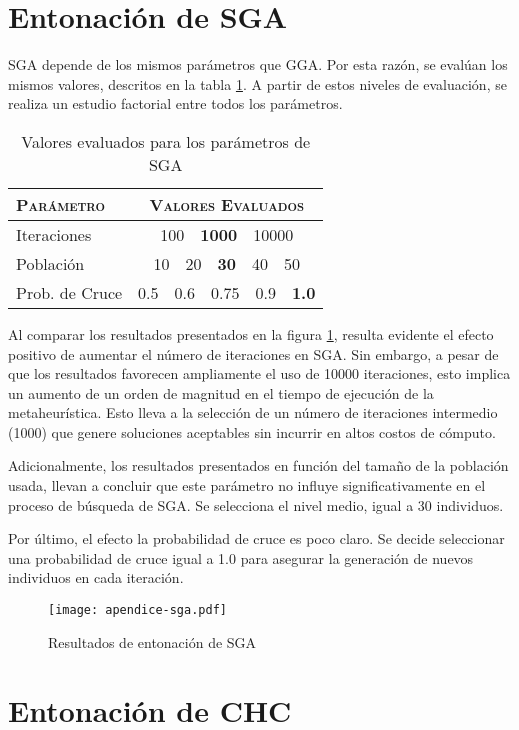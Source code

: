 \section{Entonación de SGA}

SGA depende de los mismos parámetros que GGA. Por esta razón, se evalúan los mismos valores, descritos en la tabla \ref{table-ap-sga}. A partir de estos niveles de evaluación, se realiza un estudio factorial entre todos los parámetros.

\begin{table}[h!]
\centering
\begin{tabular}{l c}
\hline
\textsc{Parámetro} & \textsc{Valores Evaluados} \\
\hline
\hline
Iteraciones & 100\ \ \textbf{1000}\ \ 10000 \\
Población   & 10\ \ 20\ \ \textbf{30}\ \ 40\ \ 50 \\
Prob. de Cruce & 0.5\ \ 0.6\ \ 0.75\ \ 0.9\ \ \textbf{1.0}\\
\hline
\end{tabular}
\caption{Valores evaluados para los parámetros de SGA}
\label{table-ap-sga}
\end{table}

Al comparar los resultados presentados en la figura \ref{fig-ap-sga}, resulta evidente el efecto positivo de aumentar el número de iteraciones en SGA. Sin embargo, a pesar de que los resultados favorecen ampliamente el uso de 10000 iteraciones, esto implica un aumento de un orden de magnitud en el tiempo de ejecución de la metaheurística. Esto lleva a la selección de un número de iteraciones intermedio (1000) que genere soluciones aceptables sin incurrir en altos costos de cómputo.

Adicionalmente, los resultados presentados en función del tamaño de la población usada, llevan a concluir que este parámetro no influye significativamente en el proceso de búsqueda de SGA. Se selecciona el nivel medio, igual a 30 individuos.

Por último, el efecto la probabilidad de cruce es poco claro. Se decide seleccionar una probabilidad de cruce igual a 1.0 para asegurar la generación de nuevos individuos en cada iteración.

\begin{figure}[h!]
\centering
\texttt{[image: apendice-sga.pdf]}
\caption{Resultados de entonación de SGA}
\label{fig-ap-sga}
\end{figure}

\section{Entonación de CHC}

